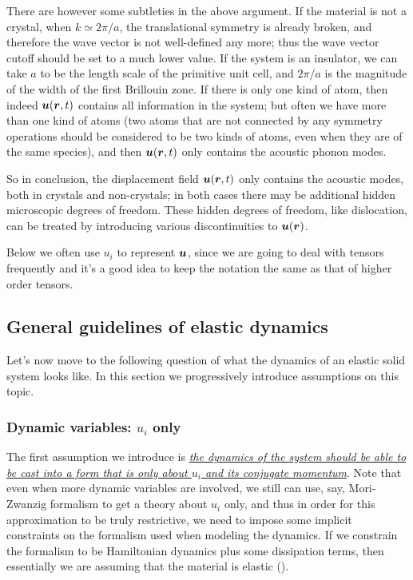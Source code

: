 \documentclass[hyperref, a4paper]{article}
\begin{document}
There are however some subtleties in the above argument.
If the material is not a crystal,
when $k \simeq 2\pi / a$,
the translational symmetry is already broken,
and therefore the wave vector is not well-defined any more;
thus the wave vector cutoff should be set to a much lower value.
If the system is an insulator, 
we can take $a$ to be the length scale of the primitive unit cell,
and $2\pi / a$ is the magnitude of the width of the first Brillouin zone.
If there is only one kind of atom,
then indeed $\vb*{u}(\vb*{r}, t)$ contains all information in the system;
but often we have more than one kind of atoms 
(two atoms that are not connected by any symmetry operations 
should be considered to be two kinds of atoms,
even when they are of the same species),
and then $\vb*{u}(\vb*{r}, t)$ only contains the acoustic phonon modes.

So in conclusion, 
the displacement field $\vb*{u}(\vb*{r}, t)$ only contains 
the acoustic modes,
both in crystals and non-crystals;
in both cases there may be additional hidden microscopic degrees of freedom.
These hidden degrees of freedom, 
like dislocation,
can be treated by introducing various discontinuities to $\vb*{u}(\vb*{r})$.

Below we often use $u_i$ to represent $\vb*{u}$, 
since we are going to deal with tensors frequently 
and it's a good idea to keep the notation the same
as that of higher order tensors.

\subsection{General guidelines of elastic dynamics}

Let's now move to the following question
of what the dynamics of an elastic solid system looks like.
In this section we progressively introduce assumptions on this topic.

\subsubsection{Dynamic variables: $u_i$ only}

The first assumption we introduce 
is \ul{\emph{the dynamics of the system should be able to be cast into a form that is only about 
$u_i$ and its conjugate momentum}}. 
Note that even when more dynamic variables are involved, 
we still can use, say, Mori-Zwanzig formalism 
to get a theory about $u_i$ only,
and thus in order for this approximation 
to be truly restrictive, 
we need to impose some implicit constraints on 
the formalism used when modeling the dynamics.
If we constrain the formalism to be Hamiltonian dynamics 
plus some dissipation terms,
then essentially we are assuming that the material is elastic ().
\end{document}

